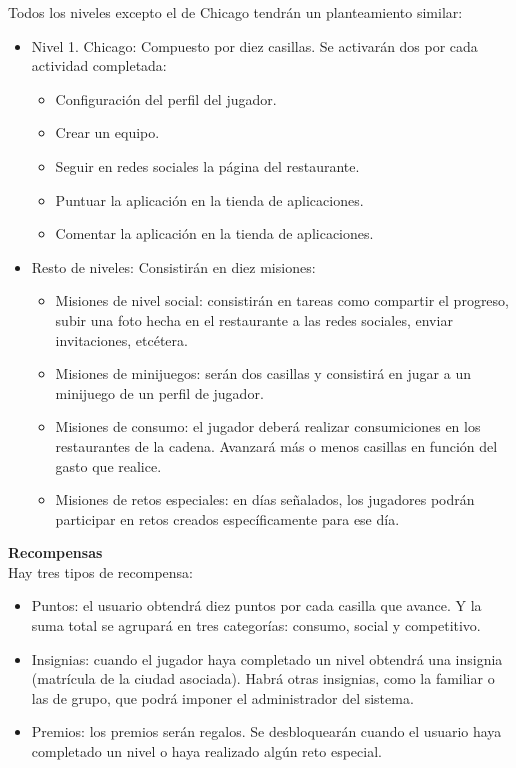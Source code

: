 \documentclass[twoside]{report}
\begin{document}
Todos los niveles excepto el de Chicago tendrán un planteamiento similar:
\begin{itemize}
\item Nivel 1. Chicago: Compuesto por diez casillas. Se activarán dos por cada actividad completada:
	\begin{itemize}
		\item Configuración del perfil del jugador.
		\item Crear un equipo.
		\item Seguir en redes sociales la página del restaurante.
		\item Puntuar la aplicación en la tienda de aplicaciones.
		\item Comentar la aplicación en la tienda de aplicaciones.
	\end{itemize}
\item Resto de niveles: Consistirán en diez misiones:
	\begin{itemize}
		\item Misiones de nivel social: consistirán en tareas como compartir el progreso, subir una foto hecha en el restaurante a las redes sociales, enviar invitaciones, etcétera.
		
		\item Misiones de minijuegos: serán dos casillas y consistirá en jugar a un minijuego de un perfil de jugador.
		
		\item Misiones de consumo: el jugador deberá realizar consumiciones en los restaurantes de la cadena. Avanzará más o menos casillas en función del gasto que realice.
		
		\item Misiones de retos especiales: en días señalados, los jugadores podrán participar en retos creados específicamente para ese día.
	\end{itemize}
\end{itemize}
\vspace{1cm}
\textbf{Recompensas}\\

Hay tres tipos de recompensa:
\begin{itemize}

\item Puntos: el usuario obtendrá diez puntos por cada casilla que avance. Y la suma total se agrupará en tres categorías: consumo, social y competitivo.

\item Insignias: cuando el jugador haya completado un nivel obtendrá una insignia (matrícula de la ciudad asociada). Habrá otras insignias, como la familiar o las de grupo, que podrá imponer el administrador del sistema.

\item Premios: los premios serán regalos. Se desbloquearán cuando el usuario haya completado un nivel o haya realizado algún reto especial.

\end{itemize}
\end{document}
